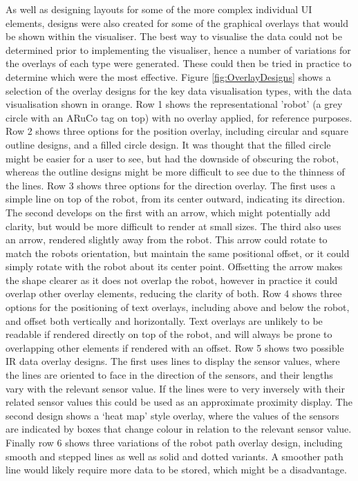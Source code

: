 As well as designing layouts for some of the more complex individual UI elements, designs were also created for some of the graphical overlays that would be shown within the visualiser. The best way to visualise the data could not be determined prior to implementing the visualiser, hence a number of variations for the overlays of each type were generated. These could then be tried in practice to determine which were the most effective. Figure \ref{fig:OverlayDesigns} shows a selection of the overlay designs for the key data visualisation types, with the data visualisation shown in orange. Row 1 shows the representational 'robot' (a grey circle with an ARuCo tag on top) with no overlay applied, for reference purposes. Row 2 shows three options for the position overlay, including circular and square outline designs, and a filled circle design. It was thought that the filled circle might be easier for a user to see, but had the downside of obscuring the robot, whereas the outline designs might be more difficult to see due to the thinness of the lines. Row 3 shows three options for the direction overlay. The first uses a simple line on top of the robot, from its center outward, indicating its direction. The second develops on the first with an arrow, which might potentially add clarity, but would be more difficult to render at small sizes. The third also uses an arrow, rendered slightly away from the robot. This arrow could rotate to match the robots orientation, but maintain the same positional offset, or it could simply rotate with the robot about its center point. Offsetting the arrow makes the shape clearer as it does not overlap the robot, however in practice it could overlap other overlay elements, reducing the clarity of both. Row 4 shows three options for the positioning of text overlays, including above and below the robot, and offset both vertically and horizontally. Text overlays are unlikely to be readable if rendered directly on top of the robot, and will always be prone to overlapping other elements if rendered with an offset. Row 5 shows two possible IR data overlay designs. The first uses lines to display the sensor values, where the lines are oriented to face in the direction of the sensors, and their lengths vary with the relevant sensor value. If the lines were to very inversely with their related sensor values this could be used as an approximate proximity display. The second design shows a `heat map' style overlay, where the values of the sensors are indicated by boxes that change colour in relation to the relevant sensor value. Finally row 6 shows three variations of the robot path overlay design, including smooth and stepped lines as well as solid and dotted variants. A smoother path line would likely require more data to be stored, which might be a disadvantage.

